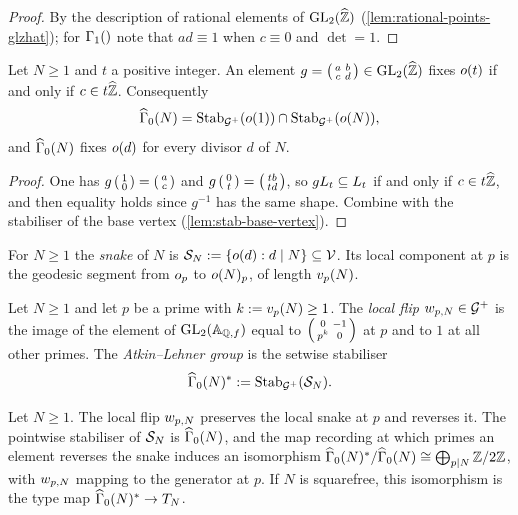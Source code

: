 \begin{proof}
By the description of rational elements of $\GL{2}{\ProfiniteIntegers}$
(\cref{lem:rational-points-glzhat}); for $\GammaOne{}$ note that $a d \equiv 1$
when $c \equiv 0$ and $\det = 1$.
\end{proof}

\begin{lemma}\label{lem:gamma0-fixer}
Let $N \geq 1$ and $t$ a positive integer. An element
$g = \smallMat{a}{b}{c}{d} \in \GL{2}{\ProfiniteIntegers}$ fixes
$o(t)$ if and only if $c \in t\widehat{\mathbb{Z}}$. Consequently
\[
  \GammaZero[ad]{N} = \Stab_{\AdelicGroup}(\StdVertex{1}) \cap \Stab_{\AdelicGroup}(\StdVertex{N}),
\]
and $\GammaZero[ad]{N}$ fixes $o(d)$ for every divisor $d$ of $N$.
\end{lemma}

\begin{proof}
One has $g\left(\begin{smallmatrix} 1 \\ 0 \end{smallmatrix}\right) = \left(\begin{smallmatrix} a \\ c \end{smallmatrix}\right)$ and
$g\left(\begin{smallmatrix} 0 \\ t \end{smallmatrix}\right) = \left(\begin{smallmatrix} tb \\ td \end{smallmatrix}\right)$, so
$gL_{t} \subseteq L_{t}$ if and only if
$c \in t\widehat{\mathbb{Z}}$, and then equality holds since $g^{-1}$ has the
same shape. Combine with the stabiliser of the base vertex
(\cref{lem:stab-base-vertex}).
\end{proof}

\begin{definition}[Snake]\label{def:snake}
For $N \geq 1$ the \emph{snake} of $N$ is
$\mathcal{S}_{N} := \{o(d) : d \mid N\} \subseteq \mathcal{V}$.
Its local component at $p$ is the geodesic segment from
$o_{p}$ to $o(N)_{p}$, of length $v_{p}(N)$.
\end{definition}

\begin{definition}
\label{def:atkin-lehner-group}
Let $N \geq 1$ and let $p$ be a prime with $k := v_{p}(N) \geq 1$. The
\emph{local flip} $w_{p,N} \in \mathcal{G}^{+}$ is the image of the
element of $\GL{2}{\FiniteAdeles{\QQ}}$ equal to
$\left(\begin{smallmatrix} 0 & -1 \\ p^{k} & 0 \end{smallmatrix}\right)$ at $p$ and to $1$ at all other primes. The
\emph{Atkin--Lehner group} is the setwise stabiliser
\[
  \GammaZeroStar[ad]{N} := \Stab_{\AdelicGroup}(\Snake{N}).
\]
\end{definition}

\begin{lemma}
\label{lem:atkin-lehner-group}
Let $N \geq 1$. The local flip $w_{p,N}$ preserves the local snake at
$p$ and reverses it. The pointwise stabiliser of $\mathcal{S}_{N}$ is
$\GammaZero[ad]{N}$, and the map recording at which primes an element
reverses the snake induces an isomorphism
$\GammaZeroStar[ad]{N}/\GammaZero[ad]{N} \cong \bigoplus_{p \mid N}\ZZ/2\ZZ$,
with $w_{p,N}$ mapping to the generator at $p$. If $N$ is squarefree,
this isomorphism is the type map
$\GammaZeroStar[ad]{N} \to \TypeGroup{N}$.
\end{lemma}

